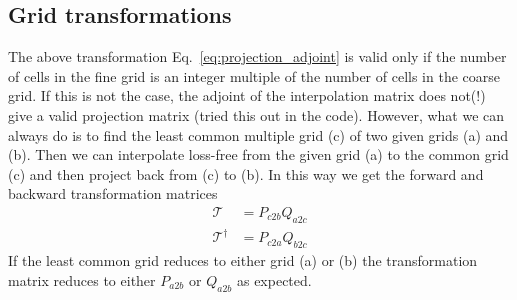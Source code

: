 \subsection{Grid transformations}
The above transformation Eq.~\eqref{eq:projection_adjoint} is
valid only if the number of cells in the fine grid is an integer multiple of the number of cells in the coarse grid. 
If this is not the case, the adjoint of the interpolation matrix
does not(!) give a valid projection matrix (tried this 
out in the code).
However, what we can always do is to find the least common multiple grid (c) of two given grids (a) and (b). Then
we can interpolate loss-free from the given grid (a) to the 
common grid (c) and then project back from (c) to (b).
In this way we get the forward and backward transformation matrices
\begin{align}
    \mathcal T &= P_{c2b}Q_{a2c}\\
    \mathcal T^\dagger &= P_{c2a} Q_{b2c}
    \label{}
\end{align}
If the least common grid reduces to either grid (a) or (b) the
transformation matrix reduces to either $P_{a2b}$ or $Q_{a2b}$ as expected.



